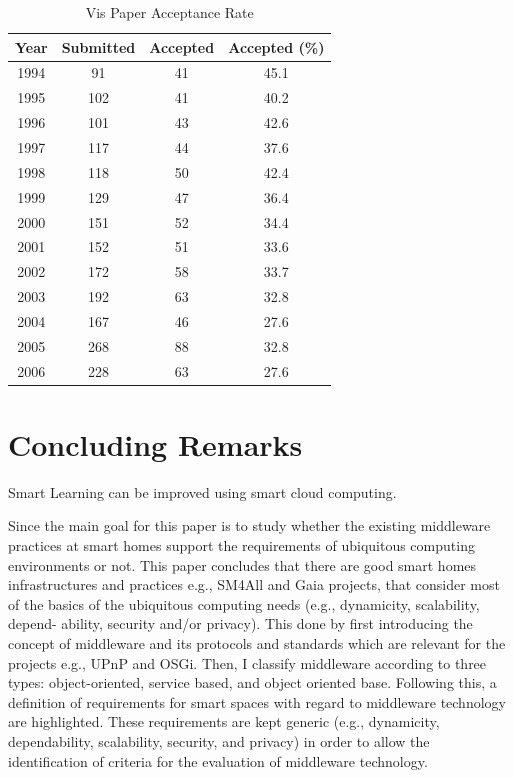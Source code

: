 \documentclass[journal]{vgtc}                %
\begin{document}
\begin{table}
  \caption{Vis Paper Acceptance Rate}
  \label{vis_accept}
  \scriptsize
  \begin{center}
    \begin{tabular}{cccc}
      Year & Submitted & Accepted & Accepted (\%)\\
    \hline
      1994 &  91 & 41 & 45.1\\
      1995 & 102 & 41 & 40.2\\
      1996 & 101 & 43 & 42.6\\
      1997 & 117 & 44 & 37.6\\
      1998 & 118 & 50 & 42.4\\
      1999 & 129 & 47 & 36.4\\
      2000 & 151 & 52 & 34.4\\
      2001 & 152 & 51 & 33.6\\
      2002 & 172 & 58 & 33.7\\
      2003 & 192 & 63 & 32.8\\
      2004 & 167 & 46 & 27.6\\
      2005 & 268 & 88 & 32.8\\
      2006 & 228 & 63 & 27.6
    \end{tabular}
  \end{center}
\end{table}


\section{Concluding Remarks}
Smart Learning can be improved using smart cloud computing.

Since the main goal for this paper is to study whether the existing middleware practices at smart homes support the requirements of ubiquitous computing environments or not. This paper concludes that there are good smart homes infrastructures and practices e.g., SM4All and Gaia projects, that consider most of the basics of the ubiquitous computing needs (e.g., dynamicity, scalability, depend- ability, security and/or privacy). This done by first introducing the concept of middleware and its protocols and standards which are relevant for the projects e.g., UPnP and OSGi. Then, I classify middleware according to three types: object-oriented, service based, and object oriented base. Following this, a definition of requirements for smart spaces with regard to middleware technology are highlighted. These requirements are kept generic (e.g., dynamicity, dependability, scalability, security, and privacy) in order to allow the identification of criteria for the evaluation of middleware technology.
\end{document}
